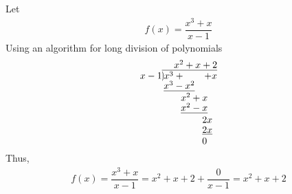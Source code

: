 \begin{example}
Let
\begin{align*}
    f(x) = \dfrac{x^{3} + x}{x - 1}
\end{align*}
Using an algorithm for long division of polynomials
\begin{align*}
\setstackgap{S}{1.5pt}
\stackMath\def\stackalignment{r}
\stackunder{
  x-1 \stackon[1pt]{\showdiv{x^{3} + \hspace{20pt} + x}}{x^{2} + x + 2}
}{
  \Shortstack[l]{{\underline{x^{3}-x^{2}}\ph{\hspace{10pt} + x}} \ph{x^{3}-}x^{2}+x {\ph{x^{3}-}\underline{x^{2}-x}} \ph{x^{3}-x^{2}-}2x {\ph{x^{3}-x^{2}-}\underline{2x}} 
   \ph{x^{3}-x^{2}-}0}
  }
\end{align*}
Thus,
\begin{align*}
    f(x) = \dfrac{x^{3} + x}{x - 1} = x^{2} + x + 2 + \dfrac{0}{x - 1} = x^{2} + x + 2
\end{align*}
\end{example}

